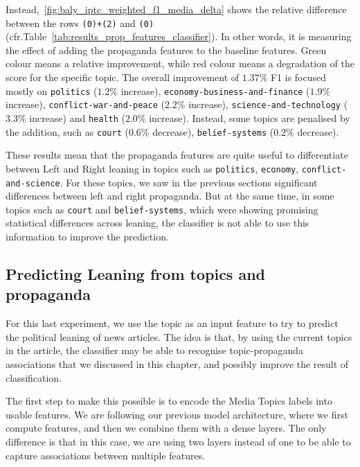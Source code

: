 Instead,~\ref{fig:baly_iptc_weighted_f1_media_delta} shows the relative difference between the rows \texttt{(0)+(2)} and \texttt{(0)} (cfr.Table~\ref{tab:results_prop_features_classifier}).
In other words, it is measuring the effect of adding the propaganda features to the baseline features. Green colour means a relative improvement, while red colour means a degradation of the score for the specific topic.
The overall improvement of $1.37\%$ F1 is focused mostly on \texttt{politics} ($1.2\%$ increase), \texttt{economy-business-and-finance} ($1.9\%$ increase), \texttt{conflict-war-and-peace} ($2.2\%$ increase), \texttt{science-and-technology} ($3.3\%$ increase) and \texttt{health} ($2.0\%$ increase). Instead, some topics are penalised by the addition, such as \texttt{court} ($0.6\%$ decrease), \texttt{belief-systems} ($0.2\%$ decrease).

These results mean that the propaganda features are quite useful to differentiate between Left and Right leaning in topics such as \texttt{politics}, \texttt{economy}, \texttt{conflict-and-science}. For these topics, we saw in the previous sections significant differences between left and right propaganda.
But at the same time, in some topics such as \texttt{court} and \texttt{belief-systems}, which were showing promising statistical differences across leaning, the classifier is not able to use this information to improve the prediction.

\subsection{\statusgreen Predicting Leaning from topics and propaganda}
\label{sec:topic_classifier_propaganda_feature}

For this last experiment, we use the topic as an input feature to try to predict the political leaning of news articles.
%
The idea is that, by using the current topics in the article, the classifier may be able to recognise topic-propaganda associations that we discussed in this chapter, and possibly improve the result of classification.

The first step to make this possible is to encode the Media Topics labels into usable features. We are following our previous model architecture, where we first compute features, and then we combine them with a dense layers. The only difference is that in this case, we are using two layers instead of one to be able to capture associations between multiple features.

